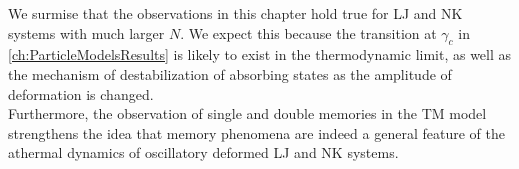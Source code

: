 We surmise that the observations in this chapter hold true for LJ and NK systems with much larger $N$. We expect this because the transition at $\gamma_{c}$ in \autoref{ch:ParticleModelsResults} is likely to exist in the thermodynamic limit, as well as the mechanism of destabilization of absorbing states as the amplitude of deformation is changed. \\
Furthermore, the observation of single and double memories in the TM model strengthens the idea that memory phenomena are indeed a general feature of the athermal dynamics of oscillatory deformed LJ and NK systems.
